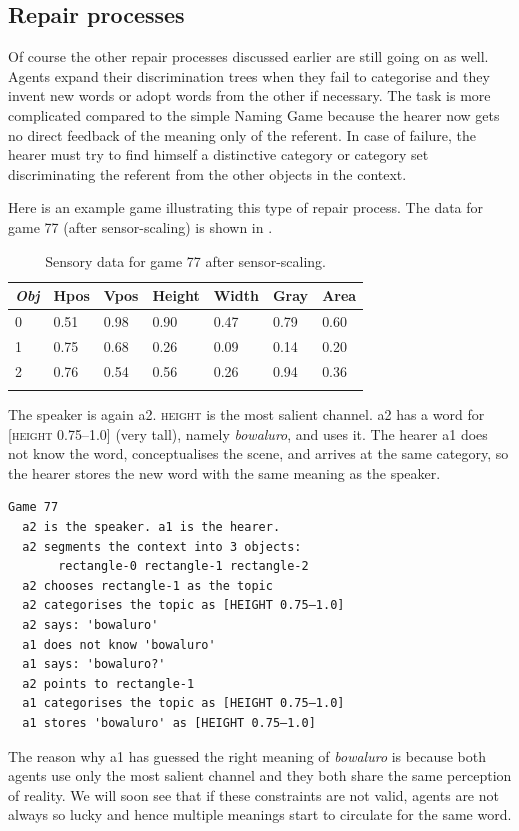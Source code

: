 \subsection{Repair processes}

Of course the other repair processes discussed earlier 
are still going on as well. Agents expand their 
discrimination trees when they fail to categorise and 
they invent new words or adopt words from the 
other if necessary. The task is more complicated compared
to the simple Naming Game because the hearer now gets
no direct feedback of the meaning only of the referent. 
In case of failure, the hearer must try to find himself a distinctive
category or category set discriminating the 
referent from the other objects in the context.

Here is an example game illustrating this
type of repair process. 
The data for game 77 (after sensor-scaling)
is shown in . 


\begin{table}
\begin{center}
\begin{tabular}{ l  l  l  l  l  l  l }
\lsptoprule
{\itshape Obj} & Hpos & Vpos & Height & Width & Gray & Area \\ \midrule
0 & 0.51 & 0.98 & 0.90 & 0.47 & 0.79 & 0.60\\ 
1 & 0.75 & 0.68 & 0.26 & 0.09 & 0.14 & 0.20\\ 
2 & 0.76 & 0.54 & 0.56 & 0.26 & 0.94 & 0.36\\ 
\lspbottomrule
\end{tabular}
\caption{\label{tab:game77}Sensory data for game 77 after sensor-scaling.}
\end{center}
\end{table}
The speaker is again {\bfshape  a2}. \textsc{height} is the most salient channel. 
{\bfshape  a2} has a word for [\textsc{height} 0.75–1.0] (very tall), namely
\textit{bowaluro}, and uses it. The hearer {\bfshape  a1} 
does not know the 
word, conceptualises the scene, and arrives at the 
same category, so the hearer stores the new word
with the same meaning as the speaker. 
\begin{verbatim}
Game 77
  a2 is the speaker. a1 is the hearer. 
  a2 segments the context into 3 objects: 
       rectangle-0 rectangle-1 rectangle-2
  a2 chooses rectangle-1 as the topic 
  a2 categorises the topic as [HEIGHT 0.75–1.0]
  a2 says: 'bowaluro'
  a1 does not know 'bowaluro'
  a1 says: 'bowaluro?'
  a2 points to rectangle-1
  a1 categorises the topic as [HEIGHT 0.75–1.0]
  a1 stores 'bowaluro' as [HEIGHT 0.75–1.0]
\end{verbatim}
The reason why {\bfshape  a1} has guessed the right 
meaning of \textit{bowaluro} is because both agents use
only the most salient channel and they both share
the same perception of reality. We will soon see 
that if these constraints are not valid, agents 
are not always so lucky and hence multiple meanings
start to circulate for the same word. 


